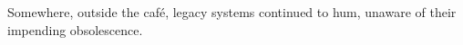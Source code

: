 Somewhere, outside the café, legacy systems continued to hum, unaware of their impending obsolescence.















